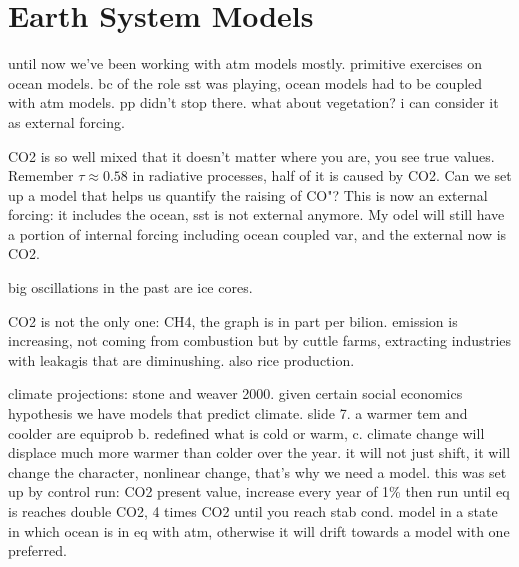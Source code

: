 
\chapter{Earth System Models}%

until now we've been working with atm models mostly. primitive exercises on ocean models. bc of the role sst was playing, ocean models had to be coupled with atm models. pp didn't stop there.
what about vegetation? i can consider it as external forcing.

CO2 is so well mixed that it doesn't matter where you are, you see true values. Remember $\tau\approx 0.58$ in radiative processes, half of it is caused by CO2.  Can we set up a model that helps us quantify the raising of CO"? This is now an external forcing: it includes the ocean, sst is not external anymore. My odel will still have a portion of internal forcing including ocean coupled var, and the external now is CO2.

big oscillations in the past are ice cores.

CO2 is not the only one: CH4, the graph is in part per bilion.  emission is increasing, not coming from combustion but by cuttle farms, extracting industries with leakagis that are diminushing. also rice production.

climate projections: stone and weaver 2000. given certain social economics hypothesis we have models that predict climate. slide 7. a warmer tem and coolder are equiprob b. redefined what is cold or warm, c. climate change will displace much more warmer than colder over the year. it will not just shift, it will change the character, nonlinear change, that's why we need a model.
this was set up by control run: CO2 present value, increase every year of 1\% then run until eq is reaches double CO2, 4 times CO2 until you reach stab cond. model in a state in which ocean is in eq with atm, otherwise it will drift towards a model with one preferred.